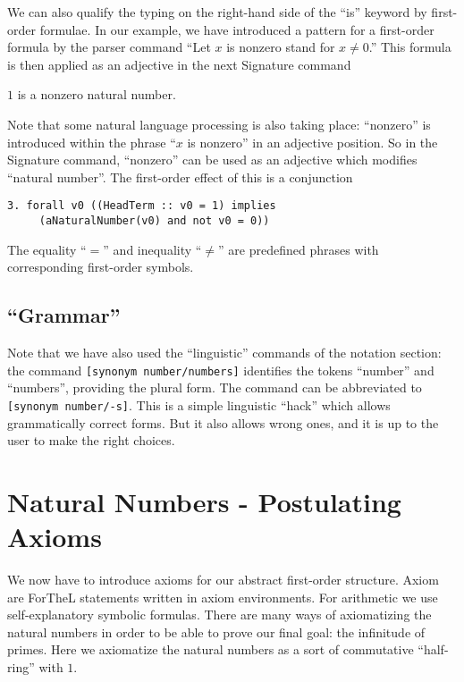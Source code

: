 \documentclass[11pt]{article}
\begin{document}
We can also qualify the typing on the right-hand side of the
``is'' keyword
by first-order formulae. In our example, we have introduced a pattern for
a first-order formula by the parser command
``Let $x$ is nonzero stand for $x \neq 0$.''
This formula is then applied
as an adjective in the next Signature command
\begin{signature} $1$ is a nonzero natural number.
\end{signature}
Note that some natural language processing is also taking place:
``nonzero'' is introduced within the phrase ``$x$ is nonzero''
in an
adjective position. So in the Signature command, ``nonzero''
can be
used as an adjective which modifies ``natural number''.
The first-order
effect of this is a conjunction
\begin{verbatim}
3. forall v0 ((HeadTerm :: v0 = 1) implies
     (aNaturalNumber(v0) and not v0 = 0))
\end{verbatim}
The equality ``$=$'' and inequality ``$\neq$'' are predefined
phrases with corresponding first-order symbols.

\subsection{``Grammar''}

Note that we have also used the ``linguistic'' commands of the
notation section: the command \verb+[synonym number/numbers]+
identifies the tokens ``number'' and ``numbers'', providing the
plural form. The command can be abbreviated to
\verb+[synonym number/-s]+. This is a simple linguistic
``hack'' which allows grammatically correct forms. But it
also allows wrong ones, and it is up to the user to make the right
choices.

\section{Natural Numbers - Postulating Axioms}

We now have to introduce axioms for our abstract first-order structure.
Axiom are ForTheL statements written in axiom environments.
For arithmetic we use self-explanatory symbolic formulas.
There are many ways of axiomatizing the natural numbers in order
to be able to prove our final goal: the infinitude of
primes. Here we axiomatize the natural numbers as
a sort of commutative ``half-ring'' with $1$.
\end{document}

